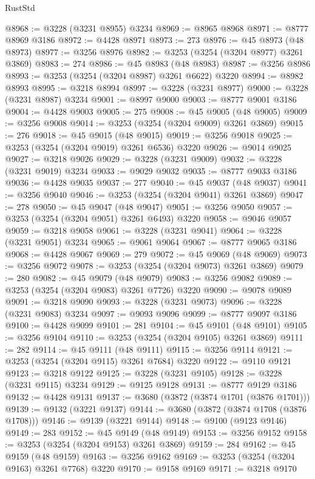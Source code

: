 \begin{lexlean}{RustStd}
\begin{coremodule}
@8968 := @3228 (@3231 @8955) @3234
@8969 := @8965 @8968
@8971 := @8777 @8969 @3186
@8972 := @4428 @8971
@8973 := 273
@8976 := @45 @8973 (@48 @8973)
@8977 := @3256 @8976
@8982 := @3253 (@3254 (@3204 @8977) @3261 @3869)
@8983 := 274
@8986 := @45 @8983 (@48 @8983)
@8987 := @3256 @8986
@8993 := @3253 (@3254 (@3204 @8987) @3261 @6622) @3220
@8994 := @8982 @8993
@8995 := @3218 @8994
@8997 := @3228 (@3231 @8977)
@9000 := @3228 (@3231 @8987) @3234
@9001 := @8997 @9000
@9003 := @8777 @9001 @3186
@9004 := @4428 @9003
@9005 := 275
@9008 := @45 @9005 (@48 @9005)
@9009 := @3256 @9008
@9014 := @3253 (@3254 (@3204 @9009) @3261 @3869)
@9015 := 276
@9018 := @45 @9015 (@48 @9015)
@9019 := @3256 @9018
@9025 := @3253 (@3254 (@3204 @9019) @3261 @6536) @3220
@9026 := @9014 @9025
@9027 := @3218 @9026
@9029 := @3228 (@3231 @9009)
@9032 := @3228 (@3231 @9019) @3234
@9033 := @9029 @9032
@9035 := @8777 @9033 @3186
@9036 := @4428 @9035
@9037 := 277
@9040 := @45 @9037 (@48 @9037)
@9041 := @3256 @9040
@9046 := @3253 (@3254 (@3204 @9041) @3261 @3869)
@9047 := 278
@9050 := @45 @9047 (@48 @9047)
@9051 := @3256 @9050
@9057 := @3253 (@3254 (@3204 @9051) @3261 @6493) @3220
@9058 := @9046 @9057
@9059 := @3218 @9058
@9061 := @3228 (@3231 @9041)
@9064 := @3228 (@3231 @9051) @3234
@9065 := @9061 @9064
@9067 := @8777 @9065 @3186
@9068 := @4428 @9067
@9069 := 279
@9072 := @45 @9069 (@48 @9069)
@9073 := @3256 @9072
@9078 := @3253 (@3254 (@3204 @9073) @3261 @3869)
@9079 := 280
@9082 := @45 @9079 (@48 @9079)
@9083 := @3256 @9082
@9089 := @3253 (@3254 (@3204 @9083) @3261 @7726) @3220
@9090 := @9078 @9089
@9091 := @3218 @9090
@9093 := @3228 (@3231 @9073)
@9096 := @3228 (@3231 @9083) @3234
@9097 := @9093 @9096
@9099 := @8777 @9097 @3186
@9100 := @4428 @9099
@9101 := 281
@9104 := @45 @9101 (@48 @9101)
@9105 := @3256 @9104
@9110 := @3253 (@3254 (@3204 @9105) @3261 @3869)
@9111 := 282
@9114 := @45 @9111 (@48 @9111)
@9115 := @3256 @9114
@9121 := @3253 (@3254 (@3204 @9115) @3261 @7684) @3220
@9122 := @9110 @9121
@9123 := @3218 @9122
@9125 := @3228 (@3231 @9105)
@9128 := @3228 (@3231 @9115) @3234
@9129 := @9125 @9128
@9131 := @8777 @9129 @3186
@9132 := @4428 @9131
@9137 := @3680 (@3872 (@3874 @1701 (@3876 @1701)))
@9139 := @9132 (@3221 @9137)
@9144 := @3680 (@3872 (@3874 @1708 (@3876 @1708)))
@9146 := @9139 (@3221 @9144)
@9148 := @9100 (@9123 @9146)
@9149 := 283
@9152 := @45 @9149 (@48 @9149)
@9153 := @3256 @9152
@9158 := @3253 (@3254 (@3204 @9153) @3261 @3869)
@9159 := 284
@9162 := @45 @9159 (@48 @9159)
@9163 := @3256 @9162
@9169 := @3253 (@3254 (@3204 @9163) @3261 @7768) @3220
@9170 := @9158 @9169
@9171 := @3218 @9170

\end{coremodule}
\end{lexlean}
